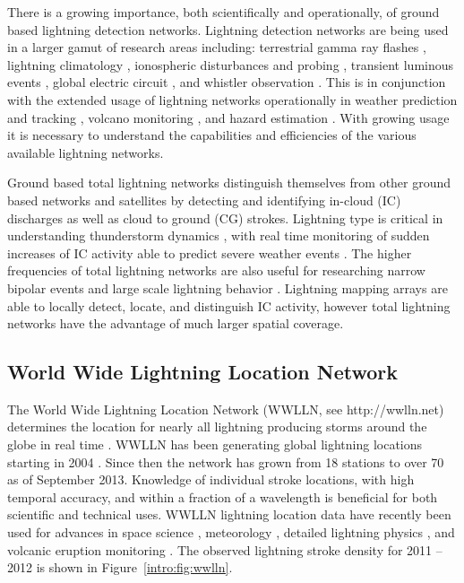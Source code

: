 There is a growing importance, both scientifically and operationally, of ground based lightning detection networks.
Lightning detection networks are being used in a larger gamut of research areas including: terrestrial gamma ray flashes \citep{Dwyer2012, Gjesteland2011, Connaughton2010}, lightning climatology \citep{Virts2013, Virts2011a, Burgesser2012}, ionospheric disturbances and probing \citep{Jacobson2010, Singh2011}, transient luminous events \citep{Soula2011}, global electric circuit  \citep{Holzworth2005}, and whistler observation \citep{Collier2010, Collier2011a, Burkholder2013}.
This is in conjunction with the extended usage of lightning networks operationally in weather prediction and tracking \citep{Fierro2012, Pan2010, Thomas2010d}, volcano monitoring \citep{Doughton2010}, and hazard estimation \citep{Altaratz2010}.
With growing usage it is necessary to understand the capabilities and efficiencies of the various available lightning networks.

Ground based total lightning networks distinguish themselves from other ground based networks and satellites by detecting and identifying in-cloud (IC) discharges as well as cloud to ground (CG) strokes.
Lightning type is critical in understanding thunderstorm dynamics \citep{Williams1989}, with real time monitoring of sudden increases of IC activity able to predict severe weather events \citep{Rudlosky2013, Darden2010, Metzger2013, Schultz2009, Schultz2011}.
The higher frequencies of total lightning networks are also useful for researching narrow bipolar events \citep{Suszcynsky2003} and large scale lightning behavior \citep{Hutchins2013}.
Lightning mapping arrays are able to locally detect, locate, and distinguish IC activity, however total lightning networks have the advantage of much larger spatial coverage.

\subsection{World Wide Lightning Location Network}

The World Wide Lightning Location Network (WWLLN, see http://wwlln.net) determines the location for nearly all lightning producing storms around the globe in real time \citep{Jacobson2006c}.
WWLLN has been generating global lightning locations starting in 2004 \citep{Rodger2006, Rodger2009}.
Since then the network has grown from 18 stations to over 70 as of September 2013.
Knowledge of individual stroke locations, with high temporal accuracy, and within a fraction of a wavelength is beneficial for both scientific and technical uses.
WWLLN lightning location data have recently been used for advances in space science \citep{Lay2007, Kumar2009, Collier2009, Holzworth2011, Jacobson2011}, meteorology \citep{Price2009,Thomas2010d}, detailed lightning physics \citep{Connaughton2010}, and volcanic eruption monitoring \citep{Doughton2010}.
The observed lightning stroke density for 2011 -- 2012 is shown in Figure~\ref{intro:fig:wwlln}.

